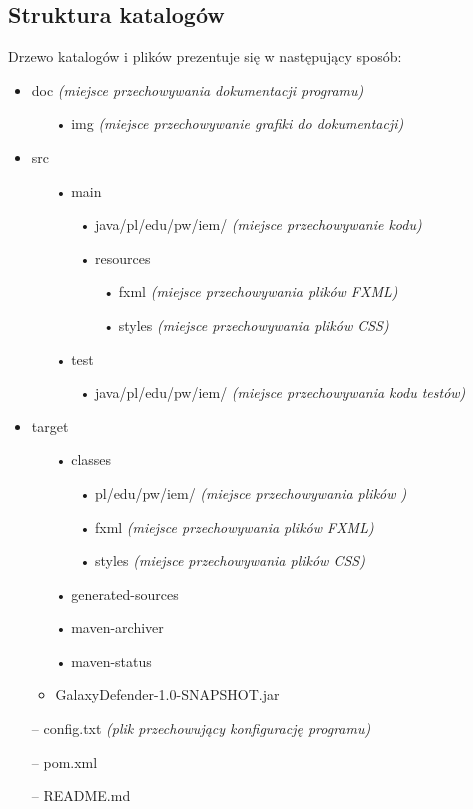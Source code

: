 \documentclass[a4paper]{article}
\begin{document}
\subsection{Struktura katalogów}
Drzewo katalogów i plików prezentuje się w następujący sposób:
\begin{itemize}
    \item doc \textit{(miejsce przechowywania dokumentacji programu)}
    \begin{itemize}
        \item[•] img \textit{(miejsce przechowywanie grafiki do dokumentacji)} 
    \end{itemize}
    \item src
    \begin{itemize}
        \item[•] main
        \begin{itemize}
            \item[•] java/pl/edu/pw/iem/ \textit{(miejsce przechowywanie kodu)}
            \item[•] resources
            \begin{itemize}
                \item[•] fxml \textit{(miejsce przechowywania plików FXML)}
                \item[•] styles \textit{(miejsce przechowywania plików CSS)}
            \end{itemize} 
        \end{itemize}
        \item[•] test
        \begin{itemize}
            \item[•] java/pl/edu/pw/iem/ \textit{(miejsce przechowywania kodu testów)}
        \end{itemize} 
    \end{itemize}
    \item target
    \begin{itemize}
        \item[•] classes
        \begin{itemize}
            \item[•] pl/edu/pw/iem/ \textit{(miejsce przechowywania plików )}
            \item[•] fxml \textit{(miejsce przechowywania plików FXML)}
            \item[•] styles \textit{(miejsce przechowywania plików CSS)}
        \end{itemize} 
        \item[•] generated-sources
        \item[•] maven-archiver
        \item[•] maven-status
        \item GalaxyDefender-1.0-SNAPSHOT.jar
    \end{itemize}
    \item[--] config.txt \textit{(plik przechowujący konfigurację programu)}
    \item[--] pom.xml
    \item[--] README.md
\end{itemize}
\end{document}
